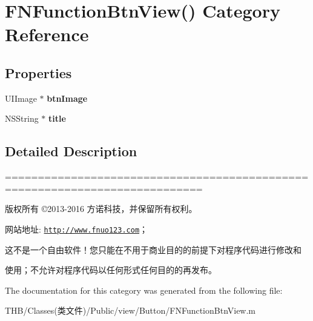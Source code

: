 \hypertarget{category_f_n_function_btn_view_07_08}{}\section{F\+N\+Function\+Btn\+View() Category Reference}
\label{category_f_n_function_btn_view_07_08}
\subsection*{Properties}
\begin{DoxyCompactItemize}
\item 
\mbox{\label{category_f_n_function_btn_view_07_08_a9e554e238a7662d8e026cdcc9937bcd2}} 
U\+I\+Image $\ast$ {\bfseries btn\+Image}
\item 
\mbox{\label{category_f_n_function_btn_view_07_08_a70527205f429c2c0c3acb21aa63da081}} 
N\+S\+String $\ast$ {\bfseries title}
\end{DoxyCompactItemize}


\subsection{Detailed Description}
============================================================================

版权所有 ©2013-\/2016 方诺科技，并保留所有权利。

网站地址\+: \href{http://www.fnuo123.com}{\tt http\+://www.\+fnuo123.\+com}； 



这不是一个自由软件！您只能在不用于商业目的的前提下对程序代码进行修改和

使用；不允许对程序代码以任何形式任何目的的再发布。 

 

The documentation for this category was generated from the following file\+:\begin{DoxyCompactItemize}
\item 
T\+H\+B/\+Classes(类文件)/\+Public/view/\+Button/F\+N\+Function\+Btn\+View.\+m\end{DoxyCompactItemize}

